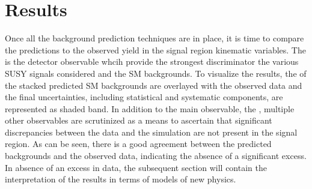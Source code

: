 \section{Results}
\noindent
\justify
Once all the background prediction techniques are in place, it is time to compare the predictions to the observed yield in the signal region kinematic variables. 
The \ptmiss is the detector observable whcih provide the strongest discriminator the various SUSY signals considered and the SM backgrounds. 
To visualize the results, the \ptmiss of the stacked predicted SM backgrounds are overlayed with the observed data and the final uncertainties, including statistical and systematic components, are represented as shaded band. 
In addition to the main observable, the \ptmiss, multiple other observables are scrutinized as a means to ascertain that significant discrepancies between the data and the simulation are not present in the signal region.
As can be seen, there is a good agreement between the predicted backgrounds and the observed data, indicating the absence of a significant excess. 
In absence of an excess in data, the subsequent section will contain the interpretation of the results in terms of models of new physics.                                              


